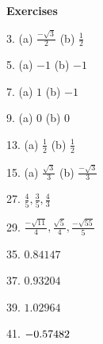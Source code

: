 \textbf{Exercises} 
\begin{multicols}{2}

3.
(a) $\frac{ -\sqrt{3}}{2}$ (b) $\frac{1}{2}$ 

5. (a) $ -1$ (b) $ -1$ 

7. (a) $1$ (b) $ -1$ 

9. (a) $0$ (b) $0$ 

13. (a) $\frac{1}{2}$ (b) $\frac{1}{2}$ 

15. (a) $\frac{\sqrt{3}}{3}$ (b) $\frac{ -\sqrt{3}}{3}$ 

27. $\frac{4}{5} ,\frac{3}{5} ,\frac{4}{3}$ 

29. $\frac{ -\sqrt{11}}{4} ,\frac{\sqrt{5}}{4} ,\frac{ -\sqrt{55}}{5}$ 

35. $0.84147$ 

37. $0.93204$ 

39. $1.02964$ 

41. $ -0.57482\vspace{+5.000000cm}$ 
\end{multicols}
\clearpage


